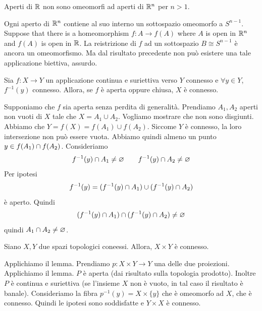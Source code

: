 \documentclass[a4paper]{article}
\begin{document}
\begin{snippetcorollary}{}
    Aperti di \(\mathbb{R}\) non sono omeomorfi ad aperti di \(\mathbb{R}^n\)
    per \(n>1\).
\end{snippetcorollary}

\begin{snippetproof}{}
    Ogni aperto di \(\mathbb{R}^n\) contiene al suo interno
    un sottospazio omeomorfo a \(S^{n-1}\).
    Suppose that there is a homeomorphism
    \(f \colon A \to f(A)\) where \(A\) is open in \(\mathbb{R}^n\)
    and \(f(A)\) is open in \(\mathbb{R}\).
    La reistrizione di \(f\) ad un sottospazio \(B \cong S^{n-1}\)
    è ancora un omeomorfismo. Ma dal risultato precedente non può esistere una tale applicazione biettiva, assurdo.
\end{snippetproof}

\begin{snippetlemma}{}
    Sia \(f \colon X \to Y\)
    un applicazione continua e suriettiva verso \(Y\) connesso
    e \(\forall y \in Y\), \(f^{-1}(y)\) connesso.
    Allora, se \(f\) è aperta oppure chiusa, \(X\) è connesso.
\end{snippetlemma}

\begin{snippetproof}{}
    Supponiamo che \(f\) sia aperta senza perdita di generalità.
    Prendiamo \(A_1, A_2\) aperti non vuoti di \(X\)
    tale che \(X = A_1 \cup A_2\).
    Vogliamo mostrare che non sono disgiunti.
    Abbiamo che \(Y = f(X) = f(A_1) \cup f(A_2)\).
    Siccome \(Y\) è connesso, la loro intersezione non può essere vuota.
    Abbiamo quindi almeno un punto \(y \in f(A_1) \cap f(A_2)\).
    Consideriamo
    \[
        f^{-1}(y) \cap A_1 \neq \varnothing
        \qquad
        f^{-1}(y) \cap A_2 \neq \varnothing
    \]
    Per ipotesi
    \[
        f^{-1}(y) = (f^{-1}(y) \cap A_1)
        \cup (f^{-1}(y) \cap A_2)
    \]
    è aperto. Quindi
    \[
        (f^{-1}(y) \cap A_1) \cap (f^{-1}(y) \cap A_2)
        \neq \varnothing
    \]
    quindi \(A_1 \cap A_2 \neq \varnothing\).
\end{snippetproof}

\begin{snippettheorem}{}
    Siano \(X, Y\) due spazi topologici coneessi.
    Allora, \(X \times Y\) è connesso.
\end{snippettheorem}

\begin{snippetproof}{}
    Applichiamo il lemma.
    Prendiamo \(p: X \times Y \to Y\) una delle due proiezioni.
    Applichiamo il lemma. \(P\) è aperta (dai risultato sulla topologia prodotto).
    Inoltre \(P\) è continua e suriettiva (se l'insieme \(X\) non è vuoto, in tal caso
    il risultato è banale). Consideriamo la fibra
    \(p^{-1}(y) = X \times \{y\}\) che è omeomorfo ad \(X\), che è connesso.
    Quindi le ipotesi sono soddisfatte e \(Y \times X\) è connesso.
\end{snippetproof}
\end{document}
